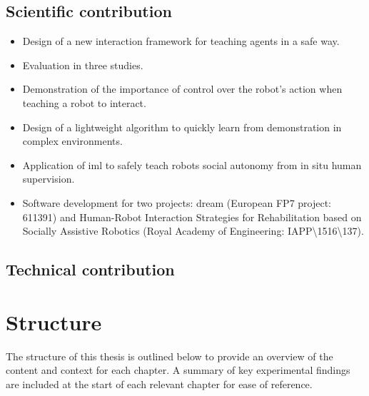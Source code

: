 \subsection{Scientific contribution}
\begin{itemize}
	\item Design of a new interaction framework for teaching agents in a safe way.
	\item Evaluation in three studies.
	\item Demonstration of the importance of control over the robot's action when teaching a robot to interact.
	\item Design of a lightweight algorithm to quickly learn from demonstration in complex environments.
	\item Application of \gls{iml} to safely teach robots social autonomy from in situ human supervision. 
	\item Software development for two projects: \acrshort{dream} (European FP7 project: 611391) and Human-Robot Interaction Strategies for Rehabilitation based on Socially Assistive Robotics (Royal Academy of Engineering: IAPP\textbackslash1516\textbackslash137).
\end{itemize}

\subsection{Technical contribution}

\section{Structure}\label{sec:intro-struct}
The structure of this thesis is outlined below to provide an overview of the content and context for each chapter. A summary of key experimental findings are included at the start of each relevant chapter for ease of reference. 

